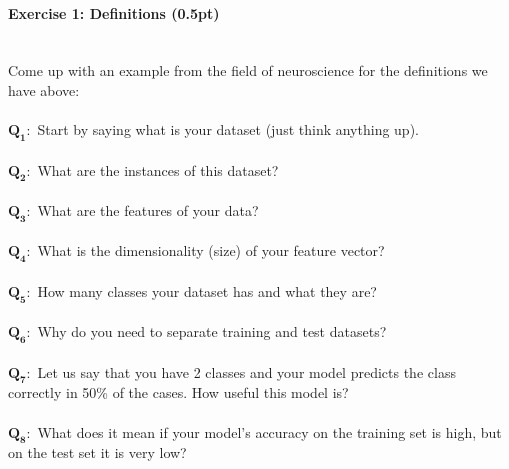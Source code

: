 \documentclass[a4paper,11pt]{article}
\newenvironment{exercise}[3]{\paragraph{Exercise #1: #2 (#3pt)}\ \\}{
\medskip}
\newcommand{\question}[2]{\setlength\parindent{0mm}\ \\$\mathbf{Q_#1:}$ #2\ \\}
\begin{document}
%
%
\begin{exercise}{1}{Definitions}{0.5}
Come up with an example from the field of neuroscience for the definitions we have above:\\
\question{1}{Start by saying what is your dataset (just think anything up).}
\question{2}{What are the instances of this dataset?}
\question{3}{What are the features of your data?}
\question{4}{What is the dimensionality (size) of your feature vector?}
\question{5}{How many classes your dataset has and what they are?}
\question{6}{Why do you need to separate training and test datasets?}
\question{7}{Let us say that you have 2 classes and your model predicts the class correctly in 50\% of the cases. How useful this model is?}
\question{8}{What does it mean if your model's accuracy on the training set is high, but on the test set it is very low?}
\end{exercise}
\end{document}
